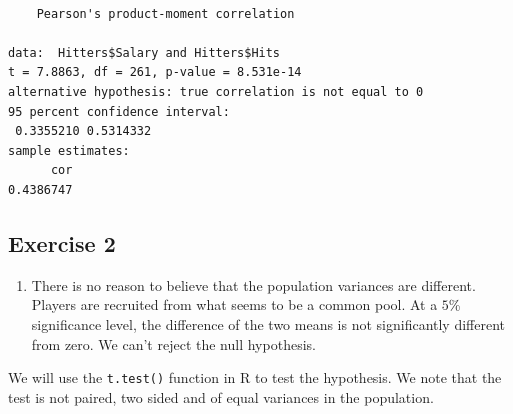 \documentclass[
  letterpaper,
  DIV=11,
  numbers=noendperiod]{scrreprt}
\newenvironment{Shaded}{\begin{snugshade}}{\end{snugshade}}
\newcommand{\AttributeTok}[1]{\textcolor[rgb]{0.40,0.45,0.13}{#1}}
\newcommand{\DecValTok}[1]{\textcolor[rgb]{0.68,0.00,0.00}{#1}}
\newcommand{\FloatTok}[1]{\textcolor[rgb]{0.68,0.00,0.00}{#1}}
\newcommand{\FunctionTok}[1]{\textcolor[rgb]{0.28,0.35,0.67}{#1}}
\newcommand{\NormalTok}[1]{\textcolor[rgb]{0.00,0.23,0.31}{#1}}
\newcommand{\SpecialCharTok}[1]{\textcolor[rgb]{0.37,0.37,0.37}{#1}}
\newcommand{\StringTok}[1]{\textcolor[rgb]{0.13,0.47,0.30}{#1}}
\providecommand{\tightlist}{%
  \setlength{\itemsep}{0pt}\setlength{\parskip}{0pt}}\usepackage{longtable,booktabs,array}
\begin{document}
\begin{Shaded}
\end{Shaded}

\begin{verbatim}

    Pearson's product-moment correlation

data:  Hitters$Salary and Hitters$Hits
t = 7.8863, df = 261, p-value = 8.531e-14
alternative hypothesis: true correlation is not equal to 0
95 percent confidence interval:
 0.3355210 0.5314332
sample estimates:
      cor 
0.4386747 
\end{verbatim}

\hypertarget{exercise-2-27}{%
\subsection*{Exercise 2}\label{exercise-2-27}}

\begin{enumerate}
\def\labelenumi{\arabic{enumi}.}
\tightlist
\item
  There is no reason to believe that the population variances are
  different. Players are recruited from what seems to be a common pool.
  At a \(5\)\% significance level, the difference of the two means is
  not significantly different from zero. We can't reject the null
  hypothesis.
\end{enumerate}

We will use the \texttt{t.test()} function in R to test the hypothesis.
We note that the test is not paired, two sided and of equal variances in
the population.

\begin{Shaded}
\end{Shaded}
\end{document}
